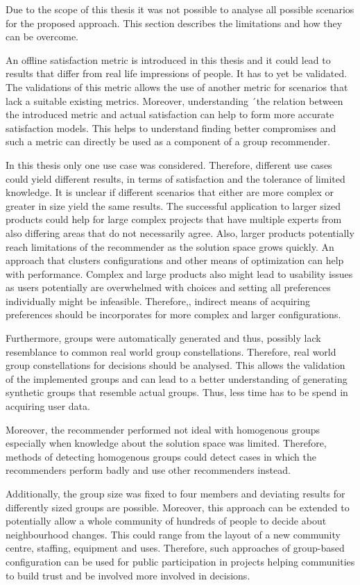 Due to the scope of this thesis it was not possible to analyse all possible scenarios for the proposed approach. This section describes the limitations and how they can be overcome.

An offline satisfaction metric is introduced in this thesis and it could lead to results that differ from real life impressions of people. It has to yet be validated. The validations of this metric allows the use of another metric for scenarios that lack a suitable existing metrics. Moreover, understanding ´the relation between the introduced metric and actual satisfaction can help to form more accurate satisfaction models. This helps to understand finding better compromises and such a metric can directly be used as a component of a group recommender.

In this thesis only one use case was considered. Therefore, different use cases could yield different results, in terms of satisfaction and the tolerance of limited knowledge. It is unclear if different scenarios that either are more complex or greater in size yield the same results. The successful application to larger sized products could help for large complex projects that have multiple experts from also differing areas that do not necessarily agree. Also, larger products potentially reach limitations of the recommender as the solution space grows quickly. An approach that clusters configurations and other means of optimization can help with performance. Complex and large products also might lead to usability issues as users potentially are overwhelmed with choices and setting all preferences individually might be infeasible. Therefore,, indirect means of acquiring preferences should be incorporates for more complex and larger configurations. 

Furthermore, groups were automatically generated and thus, possibly lack resemblance to common real world group constellations. Therefore, real world group constellations for decisions should be analysed. This allows the validation of the implemented groups and can lead to a better understanding of generating synthetic groups that resemble actual groups. Thus, less time has to be spend in acquiring user data.

Moreover, the recommender performed not ideal with homogenous groups especially when knowledge about the solution space was limited. Therefore, methods of detecting homogenous groups could detect cases in which the recommenders perform badly and use other recommenders instead.

Additionally, the group size was fixed to four members and deviating results for differently sized groups are possible. Moreover, this approach can be extended to potentially allow a whole community of hundreds of people to decide about neighbourhood changes. This could range from the layout of a new community centre, staffing, equipment and uses. Therefore, such approaches of group-based configuration can be used for public participation in projects helping communities to build trust and be involved more involved in decisions.

